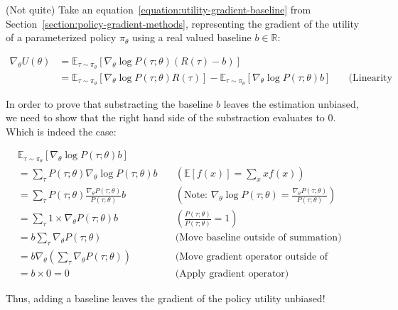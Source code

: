 \documentclass{../main.tex}{}
\begin{document}
(Not quite)
Take an equation~\ref{equation:utility-gradient-baseline} from Section~\ref{section:policy-gradient-methods}, representing the gradient of the utility of a parameterized policy $\pi_{\theta}$ using a real valued baseline $b \in \mathbb{R}$:

\begin{equation}
\begin{aligned}
    \nabla_{\theta} U(\theta) &= \mathbb{E}_{\tau \sim \pi_{\theta}} [\nabla_{\theta} \log P(\tau ; \theta)(R(\tau) - b)] \\
&= \mathbb{E}_{\tau \sim \pi_{\theta}} [\nabla_{\theta} \log P(\tau ; \theta)R(\tau)] - \mathbb{E}_{\tau \sim \pi_{\theta}} [\nabla_{\theta} \log P(\tau ; \theta)b] \quad &\text{(Linearity of expectation)}
\end{aligned}
\end{equation}

In order to prove that substracting the baseline $b$ leaves the estimation unbiased, we need to show that the right hand side of the substraction evaluates to $0$. Which is indeed the case:

\begin{equation}
\begin{aligned}
& \mathbb{E}_{\tau \sim \pi_{\theta}} [\nabla_{\theta} \log P(\tau ; \theta)b] \\
&= \sum_{\tau} P(\tau ; \theta) \nabla_{\theta} \log P(\tau ; \theta)b \quad &(\mathbb{E}[f(x)] = \sum_{x} xf(x))\\
&= \sum_{\tau} P(\tau ; \theta) \frac{\nabla_{\theta} P(\tau ; \theta)}{P(\tau ; \theta)}b \quad & (\text{Note: } \nabla_{\theta} \log P(\tau; \theta) = \frac{\nabla_{\theta}P(\tau; \theta)}{P(\tau; \theta)} )\\
&= \sum_{\tau} 1 \times \nabla_{\theta} P(\tau ; \theta)b \quad & (\frac{P(\tau ; \theta)}{P(\tau ; \theta)} = 1)\\
&= b \sum_{\tau} \nabla_{\theta} P(\tau ; \theta) \quad &\text{(Move baseline outside of summation)}\\
&= b \nabla_{\theta} (\sum_{\tau} \nabla_{\theta} P(\tau ; \theta)) \quad &\text{(Move gradient operator outside of summation)}\\
&= b \times 0 = 0 \quad & \text{(Apply gradient operator)}
\end{aligned}
\end{equation}

Thus, adding a baseline leaves the gradient of the policy utility unbiased!
\end{document}
